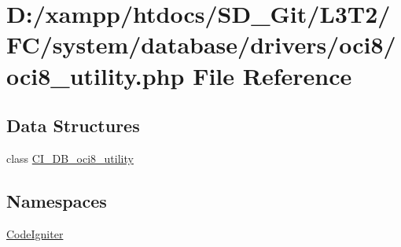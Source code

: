 \hypertarget{system_2database_2drivers_2oci8_2oci8__utility_8php}{}\section{D\+:/xampp/htdocs/\+S\+D\+\_\+\+Git/\+L3\+T2/\+F\+C/system/database/drivers/oci8/oci8\+\_\+utility.php File Reference}
\label{system_2database_2drivers_2oci8_2oci8__utility_8php}
\subsection*{Data Structures}
\begin{DoxyCompactItemize}
\item 
class \hyperlink{class_c_i___d_b__oci8__utility}{C\+I\+\_\+\+D\+B\+\_\+oci8\+\_\+utility}
\end{DoxyCompactItemize}
\subsection*{Namespaces}
\begin{DoxyCompactItemize}
\item 
 \hyperlink{namespace_code_igniter}{Code\+Igniter}
\end{DoxyCompactItemize}
